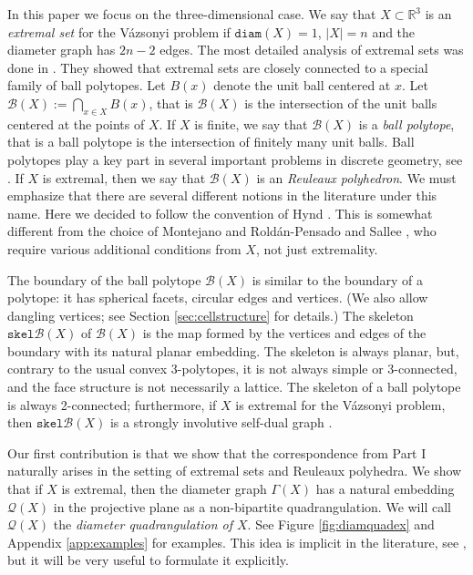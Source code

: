 \documentclass{article}
\newcounter{example}
\newcommand{\R}[0]{\mathbb{R}}
\newcommand{\Bc}[0]{\mathcal{B}}
\newcommand{\skel}[0]{\mathtt{skel}}
\newcommand{\diam}[0]{\mathtt{diam}}
\newcommand{\qt}{\mathcal{Q}}
\begin{document}
In this paper we focus on the three-dimensional case. We say that $X\subset \R^3$ is an \emph{extremal set} for the Vázsonyi problem if $\diam(X)=1$, $|X|=n$ and the diameter graph has $2n-2$ edges. The most detailed analysis of extremal sets was done in \cite{kupitz2010ball}. They showed that extremal sets are closely connected to a special family of ball polytopes. Let $B(x)$ denote the unit ball centered at $x$. Let $\Bc(X):=\bigcap_{x\in X} B(x)$, that is $\Bc(X)$ is the intersection of the unit balls centered at the points of $X$. If $X$ is finite, we say that $\Bc(X)$ is a \emph{ball polytope}, that is a ball polytope is the intersection of finitely many unit balls.  Ball polytopes play a key part in several important problems in discrete geometry, see \cite{bezdek2007ball,sallee1970reuleaux,bezdek2002pushing,bezdek2026selected}. If $X$ is extremal, then we say that $\Bc(X)$ is an \emph{Reuleaux polyhedron}. We must emphasize that there are several different notions in the literature under this name. Here we decided to follow the convention of Hynd \cite{hynd2024density}. This is somewhat different from the choice of  Montejano and Roldán-Pensado \cite{MON17} and Sallee \cite{sallee1970reuleaux}, who require various additional conditions from $X$, not just extremality.

  

 

The boundary of the ball polytope $\Bc(X)$ is similar to the boundary of a polytope: it has spherical facets, circular edges and vertices. (We also allow dangling vertices; see Section \ref{sec:cellstructure} for details.) The skeleton $\skel\Bc(X)$ of $\Bc(X)$ is the map formed by the vertices and edges of the boundary with its natural planar embedding. The skeleton is always planar, but, contrary to the usual convex 3-polytopes, it is not always simple or 3-connected, and the face structure is not necessarily a lattice.  The skeleton of a ball polytope is always 2-connected; furthermore, if $X$ is extremal for the Vázsonyi problem, then $\skel \Bc(X)$ is a strongly involutive self-dual graph \cite{kupitz2010ball}.

Our first contribution is that we show that the correspondence from Part I naturally arises in the setting of extremal sets and Reuleaux polyhedra. We show that if $X$ is extremal, then the diameter graph $\Gamma(X)$ has a natural embedding $\qt(X)$ in the projective plane as a non-bipartite quadrangulation. We will call $\qt(X)$ the \emph{diameter quadrangulation of $X$}. See Figure \ref{fig:diamquadex} and Appendix \ref{app:examples} for examples. This idea is implicit in the literature, see \cite{kupitz2010ball}, but it will be very useful to formulate it explicitly. 
\end{document}
